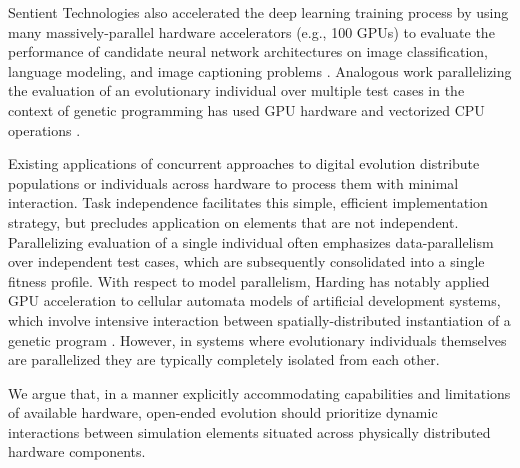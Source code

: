 Sentient Technologies also accelerated the deep learning training process by using many massively-parallel hardware accelerators (e.g., 100 GPUs) to evaluate the performance of candidate neural network architectures on image classification, language modeling, and image captioning problems
\citep{miikkulainen2019evolving}.
Analogous work parallelizing the evaluation of an evolutionary individual over multiple test cases in the context of genetic programming has used GPU hardware and vectorized CPU operations \citep{harding2007fast2, langdon2019continuous}.


Existing applications of concurrent approaches to digital evolution distribute populations or individuals across hardware to process them with minimal interaction.
Task independence facilitates this simple, efficient implementation strategy, but precludes application on elements that are not independent.
Parallelizing evaluation of a single %
individual often emphasizes data-parallelism over 
independent test cases, which are subsequently consolidated into a single fitness profile. 
With respect to model parallelism, Harding has notably applied GPU acceleration to cellular automata models of artificial development systems, which involve intensive interaction between spatially-distributed instantiation of a genetic program  \citep{harding2007fast}.
However, in systems where evolutionary individuals themselves are parallelized they are typically completely isolated from each other.

We argue that, in a manner explicitly accommodating capabilities and limitations of available hardware, open-ended evolution should prioritize dynamic interactions between simulation elements situated across physically distributed hardware components.

